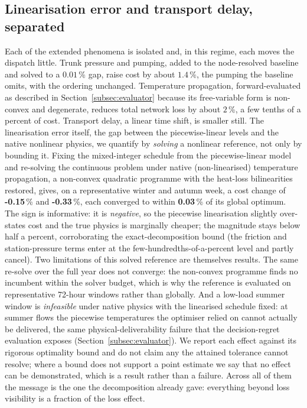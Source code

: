\documentclass[a4paper,fleqn]{cas-sc}
\begin{document}
\subsection{Linearisation error and transport delay, separated}
\label{subsec:linearisation}
Each of the extended phenomena is isolated and, in this regime, each moves the dispatch little.
Trunk pressure and pumping, added to the node-resolved baseline and solved to a $0.01$\,\%
gap, raise cost by about $1.4$\,\%, the pumping the baseline omits, with the ordering
unchanged. Temperature propagation, forward-evaluated as described in Section~\ref{subsec:evaluator}
because its free-variable form is non-convex and degenerate, reduces total network loss by about
$2$\,\%, a few tenths of a percent of cost. Transport delay, a linear time shift, is smaller
still. The linearisation error itself, the gap between the piecewise-linear levels and the
native nonlinear physics, we quantify by \emph{solving} a nonlinear reference, not only by
bounding it. Fixing the mixed-integer schedule from the piecewise-linear model and re-solving the
continuous problem under native (non-linearised) temperature propagation, a non-convex quadratic
programme with the heat-loss bilinearities restored, gives, on a representative winter and autumn
week, a cost change of \textbf{-0.15}\,\% and \textbf{-0.33}\,\%,
each converged to within \textbf{0.03}\,\% of its global optimum. The sign is
informative: it is \emph{negative}, so the piecewise linearisation slightly over-states cost and
the true physics is marginally cheaper; the magnitude stays below half a percent, corroborating
the exact-decomposition bound (the friction and station-pressure terms enter at the
few-hundredths-of-a-percent level and partly cancel). Two limitations of this solved reference are
themselves results. The same re-solve over the full year does not converge: the non-convex
programme finds no incumbent within the solver budget, which is why the reference is evaluated on
representative 72-hour windows rather than globally. And a low-load summer window is \emph{infeasible} under
native physics with the linearised schedule fixed: at summer flows the piecewise temperatures the
optimiser relied on cannot actually be delivered, the same physical-deliverability failure that the
decision-regret evaluation exposes (Section~\ref{subsec:evaluator}). We report each effect against
its rigorous optimality bound and do not claim any the attained tolerance cannot resolve; where a
bound does not support a point estimate we say that no effect can be demonstrated, which is a
result rather than a failure. Across all of them the message is the one the decomposition
already gave: everything beyond loss visibility is a fraction of the loss effect.

\end{document}
